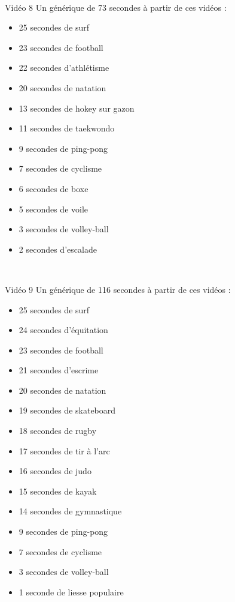 \documentclass[10pt, a5paper,twoside]{article}
\begin{document}
\vfill

\clearpage
~
\vfill

\begin{card}[width = \textwidth, colback = olympicblue, colframe = olympicblue, bottomtitle = 2mm]{Vidéo 8}
  Un générique de 73 secondes à partir de ces vidéos :
  \vspace{-1mm}\begin{itemize}
    \item 25 secondes de surf
    \item 23 secondes de football
    \item 22 secondes d'athlétisme
    \item 20 secondes de natation
    \item 13 secondes de hokey sur gazon
    \item 11 secondes de taekwondo
    \item 9 secondes de ping-pong
    \item 7 secondes de cyclisme
    \item 6 secondes de boxe
    \item 5 secondes de voile
    \item 3 secondes de volley-ball
    \item 2 secondes d'escalade
  \end{itemize}
\end{card}

\vfill

\clearpage
~
\vfill

\begin{card}[width = \textwidth, colback = olympicblue, colframe = olympicblue, bottomtitle = 2mm]{Vidéo 9}
  Un générique de 116 secondes à partir de ces vidéos :
  \vspace{-1mm}\begin{itemize}
    \item 25 secondes de surf
    \item 24 secondes d'équitation
    \item 23 secondes de football
    \item 21 secondes d'escrime
    \item 20 secondes de natation
    \item 19 secondes de skateboard
    \item 18 secondes de rugby
    \item 17 secondes de tir à l'arc
    \item 16 secondes de judo
    \item 15 secondes de kayak
    \item 14 secondes de gymnastique
    \item 9 secondes de ping-pong
    \item 7 secondes de cyclisme
    \item 3 secondes de volley-ball
    \item 1 seconde de liesse populaire
  \end{itemize}
\end{card}
\end{document}
